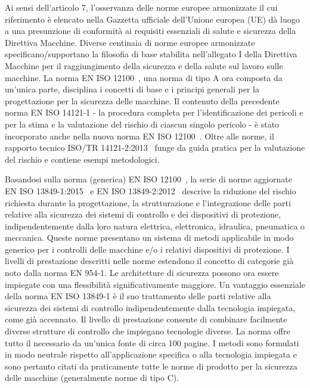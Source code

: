 Ai sensi dell'articolo 7, l'osservanza delle norme europee armonizzate il cui riferimento è elencato nella Gazzetta ufficiale dell'Unione europea (UE) dà luogo a una presunzione di conformità ai requisiti essenziali di salute e sicurezza della Direttiva Macchine. Diverse centinaia di norme europee armonizzate specificano/supportano la filosofia di base stabilita nell'allegato I della Direttiva Macchine per il raggiungimento della sicurezza e della salute sul lavoro sulle macchine. La norma EN ISO 12100~\cite{eniso12100}, una norma di tipo A ora composta da un'unica parte, disciplina i concetti di base e i principi generali per la progettazione per la sicurezza delle macchine. Il contenuto della precedente norma EN ISO 14121-1 - la procedura completa per l'identificazione dei pericoli e per la stima e la valutazione del rischio di ciascun singolo pericolo - è stato incorporato anche nella nuova norma EN ISO 12100~\cite{eniso12100}. Oltre alle norme, il rapporto tecnico ISO/TR 14121-2:2013~\cite{isotr14121-2} funge da guida pratica per la valutazione del rischio e contiene esempi metodologici.

Basandosi sulla norma (generica) EN ISO 12100~\cite{eniso12100}, la serie di norme aggiornate EN ISO 13849-1:2015~\cite{eniso13849-1} e EN ISO 13849-2:2012~\cite{eniso13849-2} descrive la riduzione del rischio richiesta durante la progettazione, la strutturazione e l'integrazione delle parti relative alla sicurezza dei sistemi di controllo e dei dispositivi di protezione, indipendentemente dalla loro natura elettrica, elettronica, idraulica, pneumatica o meccanica. Queste norme presentano un sistema di metodi applicabile in modo generico per i controlli delle macchine e/o i relativi dispositivi di protezione. I livelli di prestazione descritti nelle norme estendono il concetto di categorie già noto dalla norma EN 954-1. Le architetture di sicurezza possono ora essere impiegate con una flessibilità significativamente maggiore. Un vantaggio essenziale della norma EN ISO 13849-1 è il suo trattamento delle parti relative alla sicurezza dei sistemi di controllo indipendentemente dalla tecnologia impiegata, come già accennato. Il livello di prestazione consente di combinare facilmente diverse strutture di controllo che impiegano tecnologie diverse. La norma offre tutto il necessario da un'unica fonte di circa 100 pagine. I metodi sono formulati in modo neutrale rispetto all'applicazione specifica o alla tecnologia impiegata e sono pertanto citati da praticamente tutte le norme di prodotto per la sicurezza delle macchine (generalmente norme di tipo C).

